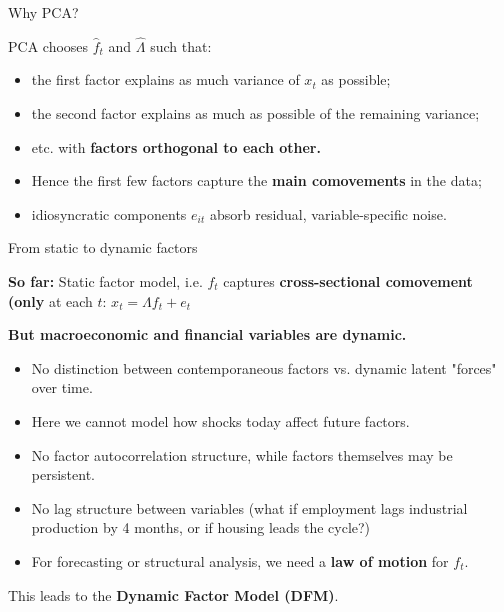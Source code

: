 \documentclass{beamer}
\begin{document}
\begin{frame}{Why PCA?}
\small

PCA chooses $\hat{f}_t$ and $\hat{\Lambda}$ such that:
\begin{itemize}
  \item the first factor explains as much variance of $x_t$ as possible;
  \item the second factor explains as much as possible of the remaining variance;
  \item etc. with\textbf{ factors orthogonal to each other.}
\end{itemize}

\medskip
\begin{itemize}
  \item Hence the first few factors capture the \textbf{main comovements} in the data;
  \item idiosyncratic components $e_{it}$ absorb residual, variable-specific noise.
\end{itemize}

\end{frame}












\begin{frame}{From static to dynamic factors}
\small

\textbf{So far:} Static factor model, i.e. $f_t$ captures \textbf{cross-sectional comovement (only} at each $t$: $x_t = \Lambda f_t + e_t$

\medskip

\textbf{But macroeconomic and financial variables are dynamic.}

\begin{itemize}
  \item No distinction between contemporaneous factors vs. dynamic latent "forces" over time.
  \item Here we cannot model how shocks today affect future factors. 
  \item No factor autocorrelation structure, while factors themselves may be persistent.
  \item No lag structure between variables (what if employment lags industrial production by 4 months, or if housing leads the cycle?)
  \item For forecasting or structural analysis, we need a \textbf{law of motion} for $f_t$.
\end{itemize}

\medskip
This leads to the \textbf{Dynamic Factor Model (DFM)}.

\end{frame}
\end{document}
